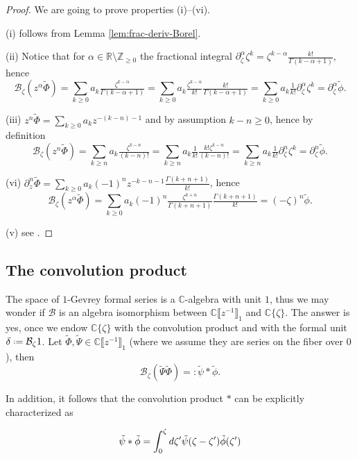 \documentclass{article}
\theoremstyle{definition}
\newcommand{\Z}{\mathbb{Z}}
\newcommand{\R}{\mathbb{R}}
\newcommand{\C}{\mathbb{C}}
\newcommand*{\defeq}{\mathrel{\vcenter{\baselineskip0.5ex \lineskiplimit0pt
                     \hbox{\scriptsize.}\hbox{\scriptsize.}}}%
                     =}
\newcommand{\borel}{\mathcal{B}}
\begin{document}
\begin{proof} 

We are going to prove properties (i)--(vi). 

(i) follows from Lemma \ref{lem:frac-deriv-Borel}. 

(ii) Notice that for $\alpha\in\R\setminus\Z_{\geq 0}$ the fractional integral $\partial_\zeta^{\alpha}\zeta^{k}=\zeta^{k-\alpha}\tfrac{k!}{\Gamma(k-\alpha+1)}$, hence \[\borel_\zeta (z^\alpha \tilde{\Phi})=\sum_{k\geq 0}a_k\tfrac{\zeta^{k-\alpha}}{\Gamma(k-\alpha+1)}=\sum_{k\geq 0}a_k\tfrac{\zeta^{k-\alpha}}{k!}\tfrac{k!}{\Gamma(k-\alpha+1)}=\sum_{k\geq 0}a_k \tfrac{1}{k!}\partial_\zeta^{\alpha}\zeta^k=\partial_\zeta^\alpha\tilde{\phi}.\]

(iii) $z^n\tilde{\Phi}=\sum_{k\geq 0}a_kz^{-(k-n)-1} $ and by assumption $k-n\geq 0$, hence by definition \[\borel_\zeta (z^n \tilde{\Phi})=\sum_{k\geq n} a_k\tfrac{\zeta^{k-n}}{(k-n)!}=\sum_{k\geq n} a_k\tfrac{1}{k!}\tfrac{k!\zeta^{k-n}}{(k-n)!}=\sum_{k\geq n} a_k\tfrac{1}{k!}\partial_\zeta^n\zeta^k=\partial_\zeta^n\tilde{\phi}.\] 

(vi) $\partial_z^n \tilde{\Phi}=\sum_{k\geq 0}a_k(-1)^{n}z^{-k-n-1}\tfrac{\Gamma(k+n+1)}{k!}$, hence \[\borel_\zeta (z^\alpha \tilde{\Phi})=\sum_{k\geq 0}a_k(-1)^{n}\tfrac{\zeta^{k+n}}{\Gamma(k+n+1)}\tfrac{\Gamma(k+n+1)}{k!}=(-\zeta)^{n}\tilde{\phi}.\]

(v) see \cite[Lemma 5.10]{diverg-resurg-i}. 

\end{proof}

\subsection{The convolution product}\label{convolution}

The space of $1$-Gevrey formal series is a $\C$-algebra with unit $1$, thus we may wonder if $\borel$ is an algebra isomorphism between $\C\llbracket z^{-1}\rrbracket_1$ and $\C\lbrace\zeta\rbrace$. The answer is yes, once we endow $\C\lbrace\zeta\rbrace$ with the convolution product and with the formal unit $\delta\defeq\borel_\zeta 1$. Let $\tilde{\Phi}, \tilde{\Psi}\in \C \llbracket z^{-1} \rrbracket_1$ (where we assume they are series on the fiber over $0$), then 
\[\borel_\zeta(\tilde{\Psi}\tilde{\Phi})=:\tilde{\psi}\ast\tilde{\phi}.\]

In addition, it follows that the convolution product $\ast$ can be explicitly characterized as 

\begin{equation}
    \tilde{\psi}\ast\Tilde{\phi}=\int_0^{\zeta}d\zeta' \tilde{\psi}(\zeta-\zeta')\tilde{\phi}(\zeta')
\end{equation}
\end{document}
